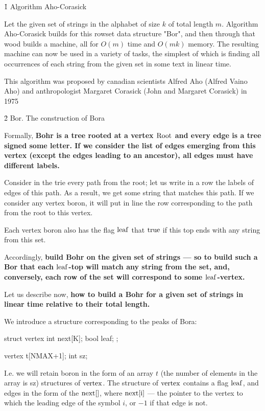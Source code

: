 \h1{ Algorithm Aho-Corasick }

Let the given set of strings in the alphabet of size $k$ of total length $m$. Algorithm Aho-Corasick builds for this rowset data structure "Bor", and then through that wood builds a machine, all for $O (m)$ time and $O (m k)$ memory. The resulting machine can now be used in a variety of tasks, the simplest of which is finding all occurrences of each string from the given set in some text in linear time.

This algorithm was proposed by canadian scientists Alfred Aho (Alfred Vaino Aho) and anthropologist Margaret Corasick (John and Margaret Corasick) in 1975


\h2{ Bor. The construction of Bora }

Formally, \bf{Bohr} is a tree rooted at a vertex $\rm Root$ and every edge is a tree signed some letter. If we consider the list of edges emerging from this vertex (except the edges leading to an ancestor), all edges must have different labels.

Consider in the trie every path from the root; let us write in a row the labels of edges of this path. As a result, we get some string that matches this path. If we consider any vertex boron, it will put in line the row corresponding to the path from the root to this vertex.

Each vertex boron also has the flag $\rm leaf$ that $\rm true$ if this top ends with any string from this set.

Accordingly, \bf{build Bohr} on the given set of strings --- so to build such a Bor that each $\rm leaf$-top will match any string from the set, and, conversely, each row of the set will correspond to some $\rm leaf$-vertex.

Let us describe now, \bf{how to build a Bohr} for a given set of strings in linear time relative to their total length.

We introduce a structure corresponding to the peaks of Bora:

\code
struct vertex {
int next[K];
bool leaf;
};

vertex t[NMAX+1];
int sz;
\endcode

I.e. we will retain boron in the form of an array $t$ (the number of elements in the array is sz) structures of $\rm vertex$. The structure of $\rm vertex$ contains a flag $\rm leaf$, and edges in the form of the $\rm next[]$, where $\rm next[i]$ --- the pointer to the vertex to which the leading edge of the symbol $i$, or $-1$ if that edge is not.

